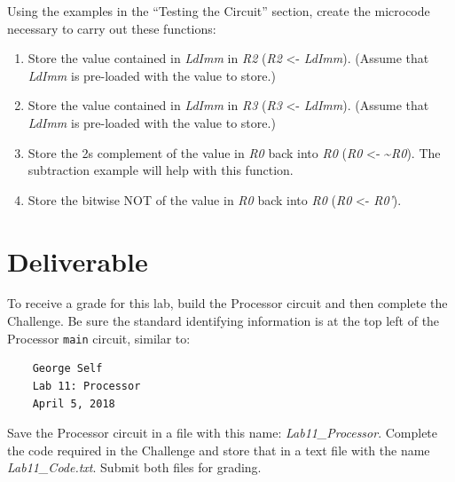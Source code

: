 Using the examples in the ``Testing the Circuit'' section, create the microcode necessary to carry out these functions:

\begin{enumerate}
	\item Store the value contained in \textit{LdImm} in \textit{R2} (\textit{R2} <- \textit{LdImm}). (Assume that \textit{LdImm} is pre-loaded with the value to store.)
	
	\item Store the value contained in \textit{LdImm} in \textit{R3} (\textit{R3} <- \textit{LdImm}). (Assume that \textit{LdImm} is pre-loaded with the value to store.)
	
	\item Store the 2s complement of the value in \textit{R0} back into \textit{R0} (\textit{R0} <- \textasciitilde \textit{R0}). The subtraction example will help with this function.
	
	\item Store the bitwise NOT of the value in \textit{R0} back into \textit{R0} (\textit{R0} <- \textit{R0'}).
\end{enumerate}

\section{Deliverable}

To receive a grade for this lab, build the Processor circuit and then complete the Challenge. Be sure the standard identifying information is at the top left of the Processor \lstinline{main} circuit, similar to: 

\bigskip
\begin{minipage}{\linewidth}
	\begin{verbatim}
	George Self
	Lab 11: Processor
	April 5, 2018
	\end{verbatim}
\end{minipage}
\bigskip

Save the Processor circuit in a file with this name: \textit{Lab11\_Processor}. Complete the code required in the Challenge and store that in a text file with the name \textit{Lab11\_Code.txt}. Submit both files for grading.
